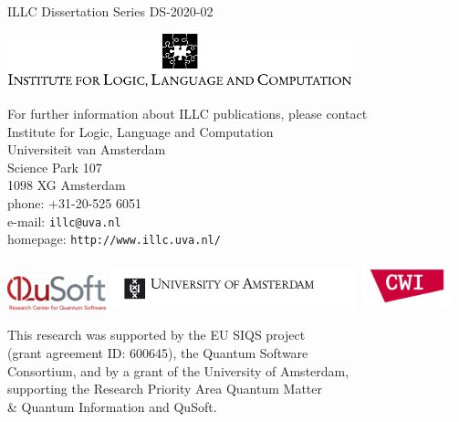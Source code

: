 

\clearpage
\thispagestyle{empty} %

\vspace*{5cm}
\begin{center}
ILLC Dissertation Series DS-2020-02                 
\par\vspace {2cm}
 \includegraphics[width=10cm]{illclogo}%
\par\vspace {1.5cm}
\noindent%
For further information about ILLC publications, please contact\\[2ex]
Institute for Logic, Language and Computation\\
Universiteit van Amsterdam\\
Science Park 107\\
1098 XG Amsterdam\\
phone: +31-20-525 6051\\
e-mail: {\tt illc@uva.nl}\\
homepage: {\tt http://www.illc.uva.nl/}
\end{center}
\vfill

\begin{center}
\includegraphics[height=1.0cm]{QuSoft_logo.jpg} \hspace{.4cm}
\includegraphics[height=1.2cm]{uvalogo.jpg} \hspace{-.5cm}
\includegraphics[height=1.4cm]{cwilogo.png}  
 \hfill

\vspace{.5cm} 
\noindent This research was supported by the EU SIQS project \\(grant agreement ID: 600645), the Quantum Software \\Consortium, and by a grant of the University of Amsterdam, \\supporting the Research Priority Area Quantum Matter \\ \& Quantum Information and QuSoft. 
\end{center}





